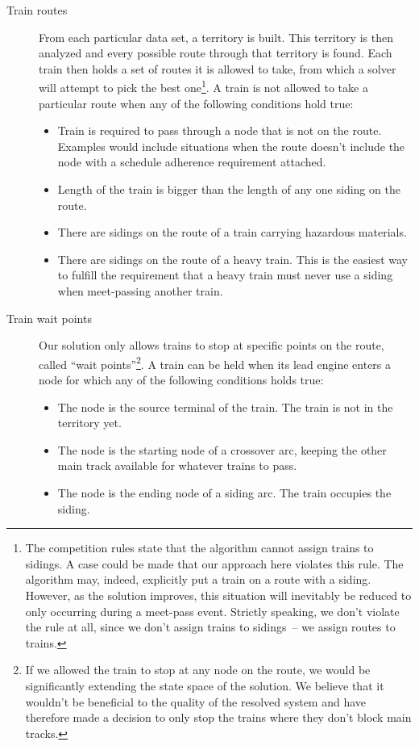 \documentclass[10pt,a4paper,final]{article}
\begin{document}
\begin{description}
\item[Train routes] From each particular data set, a territory is built. This territory is then analyzed and every possible route through that territory is found. Each train then holds a set of routes it is allowed to take, from which a solver will attempt to pick the best one\footnote{The competition rules state that the algorithm cannot assign trains to sidings. A case could be made that our approach here violates this rule. The algorithm may, indeed, explicitly put a train on a route with a siding. However, as the solution improves, this situation will inevitably be reduced to only occurring during a meet-pass event. Strictly speaking, we don't violate the rule at all, since we don't assign trains to sidings~-- we assign routes to trains.}. A train is not allowed to take a particular route when any of the following conditions hold true:

\begin{itemize}
\item Train is required to pass through a node that is not on the route. Examples would include situations when the route doesn't include the node with a schedule adherence requirement attached.
\item Length of the train is bigger than the length of any one siding on the route.
\item There are sidings on the route of a train carrying hazardous materials.
\item There are sidings on the route of a heavy train. This is the easiest way to fulfill the requirement that a heavy train must never use a siding when meet-passing another train.
\end{itemize}

\item[Train wait points] Our solution only allows trains to stop at specific points on the route, called ``wait points''\footnote{If we allowed the train to stop at any node on the route, we would be significantly extending the state space of the solution. We believe that it wouldn't be beneficial to the quality of the resolved system and have therefore made a decision to only stop the trains where they don't block main tracks.}. A train can be held when its lead engine enters a node for which any of the following conditions holds true:

\begin{itemize}
\item The node is the source terminal of the train. The train is not in the territory yet.
\item The node is the starting node of a crossover arc, keeping the other main track available for whatever trains to pass.
\item The node is the ending node of a siding arc. The train occupies the siding.
\end{itemize}


\end{description}
\end{document}
